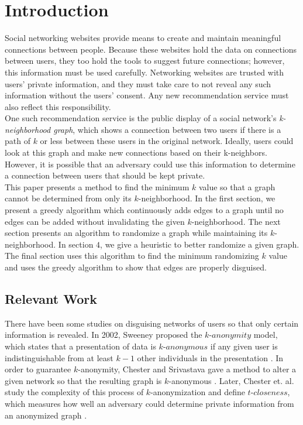 \section{Introduction}

\indent Social networking websites provide means to create and maintain meaningful connections between people. Because these websites hold the data on connections between users, they too hold the tools to suggest future connections; however, this information must be used carefully. Networking websites are trusted with users' private information, and they must take care to not reveal any such information without the users' consent. Any new recommendation service must also reflect this responsibility. \\

\indent One such recommendation service is the public display of a social network's  \emph{k-neighborhood graph}, which shows a connection between two users if there is a path of $k$ or less between these users in the original network. Ideally,  users could look at this graph and make new connections based on their k-neighbors. However, it is possible that an adversary could use this information to determine a connection between users that should be kept private. \\

\indent This paper presents a method to find the minimum $k$ value so that a graph cannot be determined from only its $k$-neighborhood. In the first section, we present a greedy algorithm which continuously adds edges to a graph until no edges can be added without invalidating the given $k$-neighborhood. The next section presents an algorithm to randomize a graph while maintaining its $k$-neighborhood. In section $4$, we give a heuristic to better randomize a given graph. The final section uses this algorithm to find the minimum randomizing $k$ value and uses the greedy algorithm to show that edges are properly disguised. \\

\subsection {Relevant Work}

\indent There have been some studies on disguising networks of users so that only certain information is revealed. In 2002, Sweeney proposed the $k$-$anonymity$ model, which states that a presentation of data is $k$-$anonymous$ if any given user is indistinguishable from at least $k-1$ other individuals in the presentation \cite{Sweeney02}. In order to guarantee $k$-anonymity, Chester and Srivastava gave a method to alter a given network so that the resulting graph is $k$-anonymous \cite{Chester11}. Later, Chester et. al. study the complexity of this process of $k$-anonymization and define $t$-$closeness$, which measures how well an adversary could determine private information from an anonymized graph \cite{Chester13}. \\

